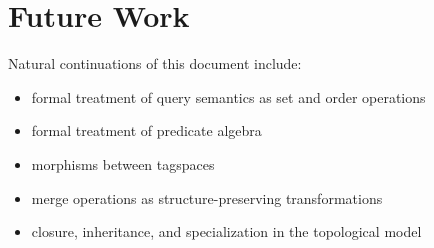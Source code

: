 \documentclass{article}
\begin{document}
\section{Future Work}

Natural continuations of this document include:

\begin{itemize}
    \item formal treatment of query semantics as set and order operations
    \item formal treatment of predicate algebra
    \item morphisms between tagspaces
    \item merge operations as structure-preserving transformations
    \item closure, inheritance, and specialization in the topological model
\end{itemize}
\end{document}
